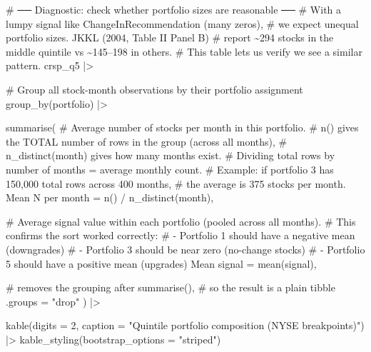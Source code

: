 \documentclass[
  letterpaper,
  DIV=11,
  numbers=noendperiod]{scrartcl}
\newenvironment{Shaded}{\begin{snugshade}}{\end{snugshade}}
\newcommand{\AttributeTok}[1]{\textcolor[rgb]{0.40,0.45,0.13}{#1}}
\newcommand{\CommentTok}[1]{\textcolor[rgb]{0.37,0.37,0.37}{#1}}
\newcommand{\DecValTok}[1]{\textcolor[rgb]{0.68,0.00,0.00}{#1}}
\newcommand{\FunctionTok}[1]{\textcolor[rgb]{0.28,0.35,0.67}{#1}}
\newcommand{\NormalTok}[1]{\textcolor[rgb]{0.00,0.23,0.31}{#1}}
\newcommand{\OtherTok}[1]{\textcolor[rgb]{0.00,0.23,0.31}{#1}}
\newcommand{\SpecialCharTok}[1]{\textcolor[rgb]{0.37,0.37,0.37}{#1}}
\newcommand{\StringTok}[1]{\textcolor[rgb]{0.13,0.47,0.30}{#1}}
\begin{document}
\begin{Shaded}
\begin{Highlighting}[]
\CommentTok{\# ── Diagnostic: check whether portfolio sizes are reasonable ──}
\CommentTok{\# With a lumpy signal like ChangeInRecommendation (many zeros),}
\CommentTok{\# we expect unequal portfolio sizes. JKKL (2004, Table II Panel B)}
\CommentTok{\# report \textasciitilde{}294 stocks in the middle quintile vs \textasciitilde{}145–198 in others.}
\CommentTok{\# This table lets us verify we see a similar pattern.}
\NormalTok{crsp\_q5 }\SpecialCharTok{|\textgreater{}}
  
  \CommentTok{\# Group all stock{-}month observations by their portfolio assignment}
  \FunctionTok{group\_by}\NormalTok{(portfolio) }\SpecialCharTok{|\textgreater{}}
  
  \FunctionTok{summarise}\NormalTok{(}
    \CommentTok{\# Average number of stocks per month in this portfolio.}
    \CommentTok{\# n() gives the TOTAL number of rows in the group (across all months),}
    \CommentTok{\# n\_distinct(month) gives how many months exist.}
    \CommentTok{\# Dividing total rows by number of months = average monthly count.}
    \CommentTok{\# Example: if portfolio 3 has 150,000 total rows across 400 months,}
    \CommentTok{\#   the average is 375 stocks per month.}
    \StringTok{\textasciigrave{}}\AttributeTok{Mean N per month}\StringTok{\textasciigrave{}} \OtherTok{=} \FunctionTok{n}\NormalTok{() }\SpecialCharTok{/} \FunctionTok{n\_distinct}\NormalTok{(month),}
    
    \CommentTok{\# Average signal value within each portfolio (pooled across all months).}
    \CommentTok{\# This confirms the sort worked correctly:}
    \CommentTok{\#   {-} Portfolio 1 should have a negative mean (downgrades)}
    \CommentTok{\#   {-} Portfolio 3 should be near zero (no{-}change stocks)}
    \CommentTok{\#   {-} Portfolio 5 should have a positive mean (upgrades)}
    \StringTok{\textasciigrave{}}\AttributeTok{Mean signal}\StringTok{\textasciigrave{}} \OtherTok{=} \FunctionTok{mean}\NormalTok{(signal),}
    
    \CommentTok{\# removes the grouping after summarise(),}
    \CommentTok{\# so the result is a plain tibble}
    \AttributeTok{.groups =} \StringTok{"drop"}
\NormalTok{  ) }\SpecialCharTok{|\textgreater{}}
  
  \FunctionTok{kable}\NormalTok{(}\AttributeTok{digits =} \DecValTok{2}\NormalTok{, }\AttributeTok{caption =} \StringTok{"Quintile portfolio composition (NYSE breakpoints)"}\NormalTok{) }\SpecialCharTok{|\textgreater{}}
  \FunctionTok{kable\_styling}\NormalTok{(}\AttributeTok{bootstrap\_options =} \StringTok{"striped"}\NormalTok{)}
\end{Highlighting}
\end{Shaded}
\end{document}
